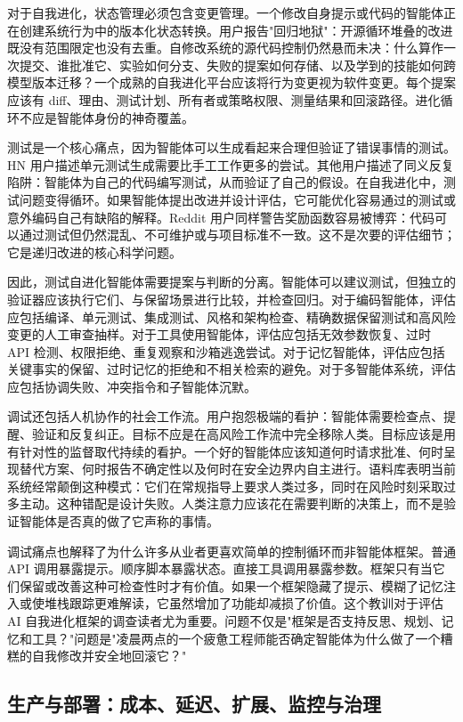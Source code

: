 对于自我进化，状态管理必须包含变更管理。一个修改自身提示或代码的智能体正在创建系统行为中的版本化状态转换。用户报告"回归地狱"：开源循环堆叠的改进既没有范围限定也没有去重。自修改系统的源代码控制仍然悬而未决：什么算作一次提交、谁批准它、实验如何分支、失败的提案如何存储、以及学到的技能如何跨模型版本迁移？一个成熟的自我进化平台应该将行为变更视为软件变更。每个提案应该有 diff、理由、测试计划、所有者或策略权限、测量结果和回滚路径。进化循环不应是智能体身份的神奇覆盖。

测试是一个核心痛点，因为智能体可以生成看起来合理但验证了错误事情的测试。HN 用户描述单元测试生成需要比手工工作更多的尝试。其他用户描述了同义反复陷阱：智能体为自己的代码编写测试，从而验证了自己的假设。在自我进化中，测试问题变得循环。如果智能体提出改进并设计评估，它可能优化容易通过的测试或意外编码自己有缺陷的解释。Reddit 用户同样警告奖励函数容易被博弈：代码可以通过测试但仍然混乱、不可维护或与项目标准不一致。这不是次要的评估细节；它是递归改进的核心科学问题。

因此，测试自进化智能体需要提案与判断的分离。智能体可以建议测试，但独立的验证器应该执行它们、与保留场景进行比较，并检查回归。对于编码智能体，评估应包括编译、单元测试、集成测试、风格和架构检查、精确数据保留测试和高风险变更的人工审查抽样。对于工具使用智能体，评估应包括无效参数恢复、过时 API 检测、权限拒绝、重复观察和沙箱逃逸尝试。对于记忆智能体，评估应包括关键事实的保留、过时记忆的拒绝和不相关检索的避免。对于多智能体系统，评估应包括协调失败、冲突指令和子智能体沉默。

调试还包括人机协作的社会工作流。用户抱怨极端的看护：智能体需要检查点、提醒、验证和反复纠正。目标不应是在高风险工作流中完全移除人类。目标应该是用有针对性的监督取代持续的看护。一个好的智能体应该知道何时请求批准、何时呈现替代方案、何时报告不确定性以及何时在安全边界内自主进行。语料库表明当前系统经常颠倒这种模式：它们在常规指导上要求人类过多，同时在风险时刻采取过多主动。这种错配是设计失败。人类注意力应该花在需要判断的决策上，而不是验证智能体是否真的做了它声称的事情。

调试痛点也解释了为什么许多从业者更喜欢简单的控制循环而非智能体框架。普通 API 调用暴露提示。顺序脚本暴露状态。直接工具调用暴露参数。框架只有当它们保留或改善这种可检查性时才有价值。如果一个框架隐藏了提示、模糊了记忆注入或使堆栈跟踪更难解读，它虽然增加了功能却减损了价值。这个教训对于评估 AI 自我进化框架的调查读者尤为重要。问题不仅是"框架是否支持反思、规划、记忆和工具？"问题是"凌晨两点的一个疲惫工程师能否确定智能体为什么做了一个糟糕的自我修改并安全地回滚它？"

\subsection{生产与部署：成本、延迟、扩展、监控与治理}
\label{subsec:production-deployment}

